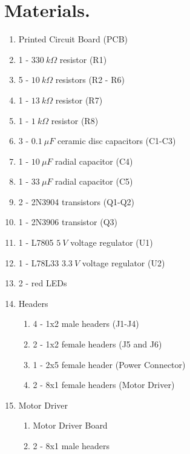 \documentclass{handout}
\begin{document}
	\section{Materials.}
\begin{minipage}{.5\textwidth}
	\begin{enumerate}
		\item Printed Circuit Board (PCB)
		\item 1 - $330\ k\Omega$ resistor (R1)
		\item 5 - $10\ k\Omega$ resistors (R2 - R6)
		\item 1 - $13\ k\Omega$ resistor (R7)
		\item 1 - $1\ k\Omega$ resistor (R8)
		\item 3 - $0.1\ \mu F$ ceramic disc capacitors (C1-C3)
		\item 1 - $10\ \mu F$ radial capacitor (C4)
		\item 1 - $33\ \mu F$ radial capacitor (C5)
		\item 2 - 2N3904 transistors (Q1-Q2)
		\item 1 - 2N3906 transistor (Q3)
	\end{enumerate}
\end{minipage}\hfill
\begin{minipage}{.5\textwidth}
	\begin{enumerate}\setcounter{enumi}{10}
		\item 1 - L7805 $5\ V$ voltage regulator (U1)
		\item 1 - L78L33 $3.3\ V$ voltage regulator (U2)
		\item 2 - red LEDs
		\item Headers
		\begin{enumerate}
			\item 4 - 1x2 male headers (J1-J4)
			\item 2 - 1x2 female headers (J5 and J6)
			\item 1 - 2x5 female header (Power Connector)
			\item 2 - 8x1 female headers (Motor Driver)
		\end{enumerate}
		\item Motor Driver
		\begin{enumerate}
			\item Motor Driver Board
			\item 2 - 8x1 male headers
		\end{enumerate}
	\end{enumerate}
\end{minipage}
\end{document}
